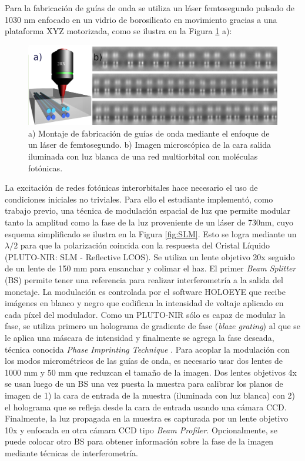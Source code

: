 \documentclass{article}
\begin{document}
Para la fabricación de guías de onda se utiliza un láser femtosegundo pulsado de 1030 nm enfocado en un vidrio de borosilicato en movimiento gracias a una plataforma XYZ motorizada, como se ilustra en la Figura \ref{fig:femtosetup} a): 

\begin{figure}[H]
	\centering
	\includegraphics[width=0.7\linewidth]{./media/femtosetup.png}
	\caption{a) Montaje de fabricación de guías de onda mediante el enfoque de un láser de femtosegundo. b) Imagen microscópica de la cara salida iluminada con luz blanca de una red multiorbital con moléculas fotónicas. \label{fig:femtosetup}}
\end{figure}


La excitación de redes fotónicas interorbitales hace necesario el uso de condiciones iniciales no triviales. Para ello el estudiante implementó, como trabajo previo, una técnica de modulación espacial de luz que permite modular tanto la amplitud como la fase de la luz proveniente de un láser de 730nm, cuyo esquema simplificado se ilustra en la Figura \ref{fig:SLM}. Esto se logra mediante un $\lambda/2$ para que la polarización coincida con la respuesta del Cristal Líquido (PLUTO-NIR: SLM - Reflective LCOS). Se utiliza un lente objetivo 20x seguido de un lente de 150 mm para ensanchar y colimar el haz. El primer \textit{Beam Splitter} (BS) permite tener una referencia para realizar interferometría a la salida del monetaje. La modulación es controlada por el software HOLOEYE que recibe imágenes en blanco y negro que codifican la intensidad de voltaje aplicado en cada píxel del modulador. Como un PLUTO-NIR sólo es capaz de modular la fase, se utiliza primero un holograma de gradiente de fase (\textit{blaze grating}) al que se le aplica una máscara de intensidad y finalmente se agrega la fase deseada, técnica conocida \textit{Phase Imprinting Technique} \cite{slm}. Para acoplar la modulación con los modos micrométricos de las guías de onda, es necesario usar dos lentes de 1000 mm y 50 mm que reduzcan el tamaño de la imagen. Dos lentes objetivos 4x se usan luego de un BS una vez puesta la muestra para calibrar los planos de imagen de 1) la cara de entrada de la muestra (iluminada con luz blanca) con 2) el holograma que se refleja desde la cara de entrada usando una cámara CCD. Finalmente, la luz propagada en la muestra es capturada por un lente objetivo 10x y enfocada en otra cámara CCD tipo \textit{Beam Profiler}. Opcionalmente, se puede colocar otro BS para obtener información sobre la fase de la imagen mediante técnicas de interferometría.
\end{document}
